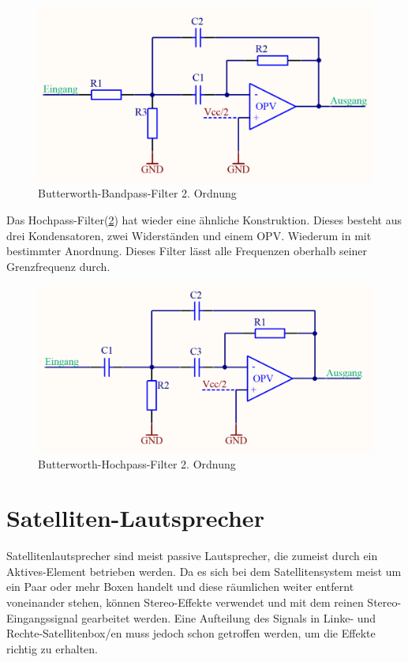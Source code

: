 \begin{figure} [H]
	\centering
	\includegraphics[width=1\textwidth]{img/Print4/BPFilter-Butterworth2Ordnung.PNG}
	\caption{Butterworth-Bandpass-Filter 2. Ordnung}
	\label {fig:3.3.2.2}
\end{figure}
Das Hochpass-Filter(\ref{fig:3.3.2.3}) hat wieder eine ähnliche Konstruktion. Dieses besteht aus drei Kondensatoren, zwei Widerständen und einem OPV. Wiederum in mit bestimmter Anordnung.  Dieses Filter lässt alle Frequenzen oberhalb seiner Grenzfrequenz durch.
\begin{figure} [H]
	\centering	
	\includegraphics[width=1\textwidth]{img/Print4/HPFilter-Butterworth2Ordnung.PNG}
	\caption{Butterworth-Hochpass-Filter 2. Ordnung}
	\label {fig:3.3.2.3}
\end{figure}

\section{Satelliten-Lautsprecher}\label{sec:3.4}
Satellitenlautsprecher sind meist passive Lautsprecher, die zumeist durch ein Aktives-Element betrieben werden. Da es sich bei dem Satellitensystem meist um ein Paar oder mehr Boxen handelt und diese räumlichen weiter entfernt voneinander stehen, können Stereo-Effekte verwendet und mit dem reinen Stereo-Eingangssignal gearbeitet werden. Eine Aufteilung des Signals in Linke- und Rechte-Satellitenbox/en muss jedoch schon getroffen werden, um die Effekte richtig zu erhalten.

